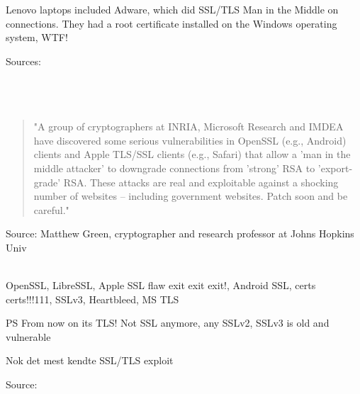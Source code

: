 \documentclass[Screen16to9,17pt]{foils}
\begin{document}


Lenovo laptops included Adware, which did SSL/TLS Man in the Middle on connections.
They had a root certificate installed on the Windows operating system, WTF!

{\footnotesize Sources:\\
\\
\\
\\
}{\tiny{}
}




\begin{quote}\small
"A group of cryptographers at INRIA, Microsoft Research and IMDEA have discovered some serious vulnerabilities in OpenSSL (e.g., Android) clients and Apple TLS/SSL clients (e.g., Safari) that allow a 'man in the middle attacker' to downgrade connections from 'strong' RSA to 'export-grade' RSA. These attacks are real and exploitable against a shocking number of websites -- including government websites. Patch soon and be careful."
\end{quote}

Source: Matthew Green, cryptographer and research professor at Johns Hopkins Univ\\
{\footnotesize{}\\
 
}

OpenSSL, LibreSSL, Apple SSL flaw exit exit exit!, Android SSL, certs certs!!!111, SSLv3, Heartbleed, MS TLS


\vskip 1cm
PS From now on its TLS! Not SSL anymore, any SSLv2, SSLv3 is old and vulnerable



\centerline{Nok det mest kendte SSL/TLS exploit}

Source: 


\end{document}
